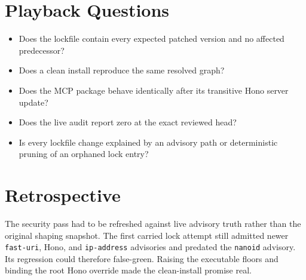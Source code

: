 \section{Playback Questions}\label{record-248-playback-questions}

\begin{itemize}
\tightlist
\item
  Does the lockfile contain every expected patched version and no affected predecessor?
\item
  Does a clean install reproduce the same resolved graph?
\item
  Does the MCP package behave identically after its transitive Hono server update?
\item
  Does the live audit report zero at the exact reviewed head?
\item
  Is every lockfile change explained by an advisory path or deterministic pruning of an orphaned lock entry?
\end{itemize}

\section{Retrospective}\label{record-248-retrospective}

The security pass had to be refreshed against live advisory truth rather than the original shaping snapshot. The first carried lock attempt still admitted newer \texttt{f\allowbreak{}a\allowbreak{}s\allowbreak{}t\allowbreak{}-\allowbreak{}u\allowbreak{}r\allowbreak{}i}, Hono, and \texttt{i\allowbreak{}p\allowbreak{}-\allowbreak{}a\allowbreak{}d\allowbreak{}d\allowbreak{}r\allowbreak{}e\allowbreak{}s\allowbreak{}s} advisories and predated the \texttt{n\allowbreak{}a\allowbreak{}n\allowbreak{}o\allowbreak{}i\allowbreak{}d} advisory. Its regression could therefore false-green. Raising the executable floors and binding the root Hono override made the clean-install promise real.


